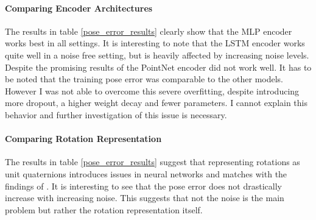 \documentclass{article}
\begin{document}
\paragraph{Comparing Encoder Architectures}
The results in table \ref{pose_error_results} clearly show that the MLP encoder works best in all settings. It is interesting to note that the LSTM encoder works quite well in a noise free setting, but is heavily affected by increasing noise levels. Despite the promising results of \cite{PointNet} the PointNet encoder did not work well. It has to be noted that the training pose error was comparable to the other models. However I was not able to overcome this severe overfitting, despite introducing more dropout, a higher weight decay and fewer parameters. I cannot explain this behavior and further investigation of this issue is necessary.

\paragraph{Comparing Rotation Representation}
The results in table \ref{pose_error_results} suggest that representing rotations as unit quaternions introduces issues in neural networks and matches with the findings of \cite{rotation_representation}. It is interesting to see that the pose error does not drastically increase with increasing noise. This suggests that not the noise is the main problem but rather the rotation representation itself.\\
\end{document}

